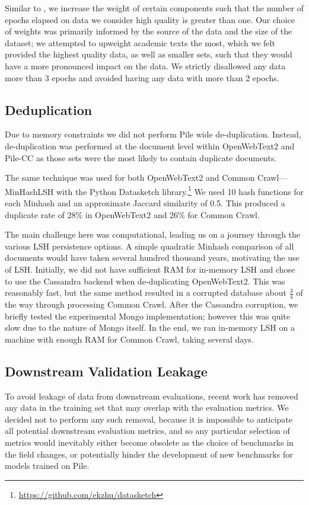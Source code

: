 \documentclass[11pt,a4paper]{article}
\begin{document}
\begin{appendices}
Similar to \citet{GPT3}, we increase the weight of certain components such that the number of epochs elapsed on data we consider high quality is greater than one. Our choice of weights was primarily informed by the source of the data and the size of the dataset; we attempted to upweight academic texts the most, which we felt provided the highest quality data, as well as smaller sets, such that they would have a more pronounced impact on the data. We strictly disallowed any data more than 3 epochs and avoided having any data with more than 2 epochs.

\subsection{Deduplication}\label{apdx:deduplication}

Due to memory constraints we did not perform Pile wide de-duplication. Instead, de-duplication was performed at the document level within OpenWebText2 and Pile-CC as those sets were the most likely to contain duplicate documents. 

The same technique was used for both OpenWebText2 and Common Crawl---MinHashLSH with the Python Datasketch library.\footnote{\url{https://github.com/ekzhu/datasketch}} We used 10 hash functions for each Minhash and an approximate Jaccard similarity of 0.5. This produced a duplicate rate of 28\% in OpenWebText2 and 26\% for Common Crawl.

The main challenge here was computational, leading us on a journey through the various LSH persistence options. A simple quadratic Minhash comparison of all documents would have taken several hundred thousand years, motivating the use of LSH. Initially, we did not have sufficient RAM for in-memory LSH and chose to use the Cassandra backend when de-duplicating OpenWebText2. This was reasonably fast, but the same method resulted in a corrupted database about $\frac{3}{4}$ of the way through processing Common Crawl. After the Cassandra corruption, we briefly tested the experimental Mongo implementation; however this was quite slow due to the nature of Mongo itself. In the end, we ran in-memory LSH on a machine with enough RAM for Common Crawl, taking several days.

\subsection{Downstream Validation Leakage}

To avoid leakage of data from downstream evaluations, recent work \citep{GPT2,GPT3,Megatron} has removed any data in the training set that may overlap with the evaluation metrics. We decided not to perform any such removal, because it is impossible to anticipate all potential downstream evaluation metrics, and so any particular selection of metrics would inevitably either become obsolete as the choice of benchmarks in the field changes, or potentially hinder the development of new benchmarks for models trained on Pile.


\end{appendices}
\end{document}
